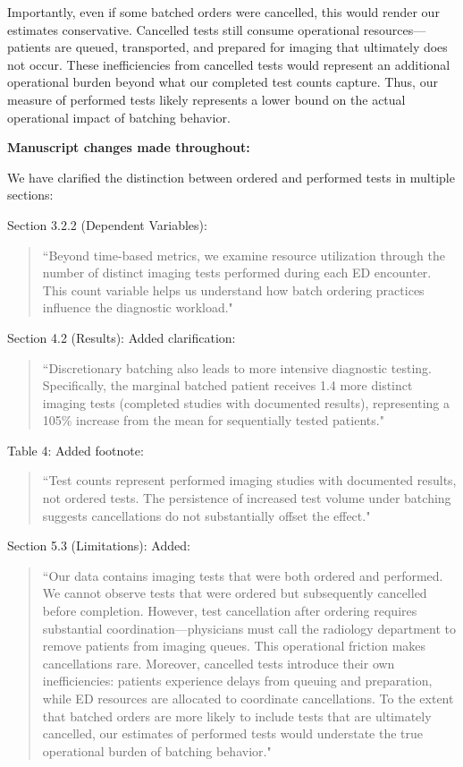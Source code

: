 \documentclass[11pt]{article}
\newcommand{\1}{\hbox{\rm 1\kern-.35em 1}}
\begin{document}
{Importantly, even if some batched orders were cancelled, this would render our estimates conservative. Cancelled tests still consume operational resources—patients are queued, transported, and prepared for imaging that ultimately does not occur. These inefficiencies from cancelled tests would represent an additional operational burden beyond what our completed test counts capture. Thus, our measure of performed tests likely represents a lower bound on the actual operational impact of batching behavior.

\textbf{Manuscript changes made throughout:}

We have clarified the distinction between ordered and performed tests in multiple sections:

Section 3.2.2 (Dependent Variables): 
\begin{quote}
``Beyond time-based metrics, we examine resource utilization through the number of distinct imaging tests performed during each ED encounter. This count variable helps us understand how batch ordering practices influence the diagnostic workload."
\end{quote}

Section 4.2 (Results): Added clarification: 
\begin{quote}
``Discretionary batching also leads to more intensive diagnostic testing. Specifically, the marginal batched patient receives 1.4 more distinct imaging tests (completed studies with documented results), representing a 105\% increase from the mean for sequentially tested patients."
\end{quote}

Table 4: Added footnote: 
\begin{quote}
``Test counts represent performed imaging studies with documented results, not ordered tests. The persistence of increased test volume under batching suggests cancellations do not substantially offset the effect."
\end{quote}

Section 5.3 (Limitations): Added: 
\begin{quote}
``Our data contains imaging tests that were both ordered and performed. We cannot observe tests that were ordered but subsequently cancelled before completion. However, test cancellation after ordering requires substantial coordination—physicians must call the radiology department to remove patients from imaging queues. This operational friction makes cancellations rare. Moreover, cancelled tests introduce their own inefficiencies: patients experience delays from queuing and preparation, while ED resources are allocated to coordinate cancellations. To the extent that batched orders are more likely to include tests that are ultimately cancelled, our estimates of performed tests would understate the true operational burden of batching behavior."
\end{quote}

}
\end{document}
